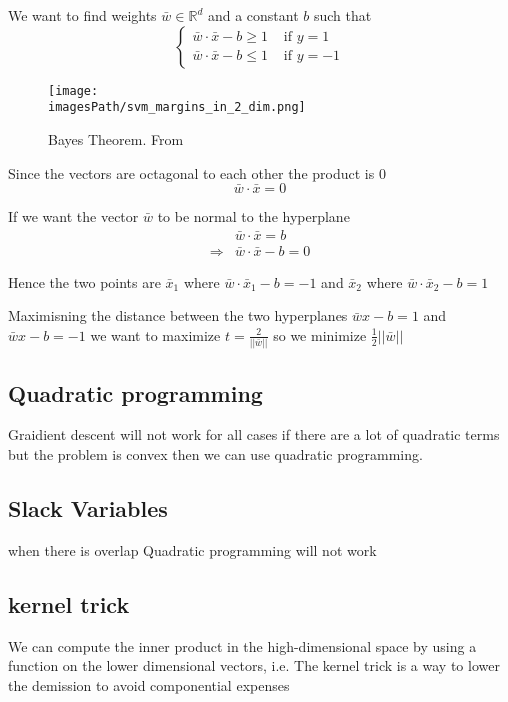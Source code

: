 We want to find weights $\bar{w} \in \mathbb{R}^d$ and a constant $b$ such that
\begin{equation*}
    \begin{cases}
        \bar{w} \cdot \bar{x} -b \geq 1 & \text{ if } y=1 \\
        \bar{w} \cdot \bar{x} -b \leq 1 & \text{ if } y=-1
    \end{cases}
\end{equation*}


\begin{figure}[!h]
    \centering
    \texttt{[image: \\imagesPath/svm\_margins\_in\_2\_dim.png]}
    \caption{Bayes Theorem. From \cite{}}
\end{figure}


Since the vectors are octagonal to each other the product is 0
\begin{equation*}
    \bar{w}\cdot\bar{x} = 0
\end{equation*}

If we want the vector $\bar{w}$ to be normal to the hyperplane
\begin{align*}
    &\bar{w}\cdot\bar{x} = b \\
    \Rightarrow &\bar{w}\cdot\bar{x} - b = 0
\end{align*}

Hence the two points are $\bar{x}_1$ where $\bar{w}\cdot\bar{x}_1 -b = -1$ and 
$\bar{x}_2$ where $\bar{w}\cdot\bar{x}_2 -b = 1$

Maximisning the distance between the two hyperplanes $\bar{w}x-b=1$ and $\bar{w}x-b=-1$
we want to maximize $t=\frac{2}{||\bar{w}||}$ so we minimize $\frac{1}{2}||\bar{w}||$

\subsection{Quadratic programming}
Graidient descent will not work for all cases if there are a lot of quadratic terms but 
the problem is convex then we can use quadratic programming.

\subsection{Slack Variables}
when there is overlap Quadratic programming will not work

\subsection{kernel trick}
We can compute the inner product in the high-dimensional space by
using a function on the lower dimensional vectors,
i.e. The kernel trick is a way to lower the demission to avoid componential expenses

